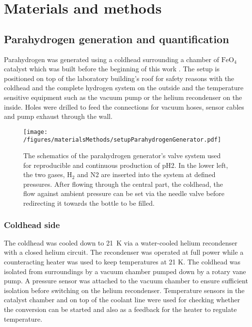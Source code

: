 \chapter{Materials and methods}\label{chap:MaterialsAndMethods}
\label{chapter:matMeth}
    \section{Parahydrogen generation and quantification}
    Parahydrogen was generated using a coldhead surrounding a chamber of $\mathrm{FeO_4}$ catalyst which was built before the beginning of this work \cite{hovener_continuous-flow_2013}. The setup is positioned on top of the laboratory building's roof for safety reasons with the coldhead and the complete hydrogen system on the outside and the temperature sensitive equipment such as the vacuum pump or the helium recondenser on the inside. Holes were drilled to feed the connections for vacuum hoses, sensor cables and pump exhaust through the wall.
    \begin{figure}
        \texttt{[image: /figures/materialsMethods/setupParahydrogenGenerator.pdf]}
        \caption[Parahydrogen generator scheme]{The schematics of the parahydrogen generator's valve system used for reproducible and continuous production of pH2. In the lower left, the two gases, H$_2$ and N2 are inserted into the system at defined pressures. After flowing through the central part, the coldhead, the flow against ambient pressure can be set via the needle valve before redirecting it towards the bottle to be filled.}
        \label{figure:materialsMethods:pH2Generator}
    \end{figure}
        \subsection{Coldhead side}
            The coldhead was cooled down to \SI{21}{\kelvin} via a water-cooled helium recondenser with a closed helium circuit. The recondenser was operated at full power while a counteracting heater was used to keep temperatures at 21 K. The coldhead was isolated from surroundings by a vacuum chamber pumped down by a rotary vane pump. A pressure sensor was attached to the vacuum chamber to ensure sufficient isolation before switching on the helium recondenser. Temperature sensors in the catalyst chamber and on top of the coolant line were used for checking whether the conversion can be started and also as a feedback for the heater to regulate temperature.
